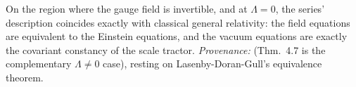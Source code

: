 On the region where the gauge field is invertible, and at $\Lambda = 0$, the series' description coincides exactly with classical general relativity: the field equations are equivalent to the Einstein equations, and the vacuum equations are exactly the covariant constancy of the scale tractor. \emph{Provenance:} \cite[Fact 2.1, Thms.~4.5 and 4.7]{ButlerT6} (Thm.~4.7 is the complementary $\Lambda \neq 0$ case), resting on Lasenby-Doran-Gull's equivalence theorem.
